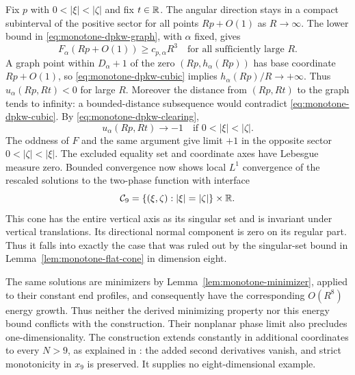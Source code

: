 Fix $p$ with $0<|\xi|<|\zeta|$ and fix $t\in\mathbb R$.
The angular direction stays in a compact subinterval of the positive
sector for all points $Rp+O(1)$ as $R\to\infty$.  The lower bound
in \eqref{eq:monotone-dpkw-graph}, with $\alpha$ fixed, gives
\begin{equation}
 F_\alpha(Rp+O(1))\ge c_{p,\alpha}R^3
 \quad\text{for all sufficiently large }R.
 \label{eq:monotone-dpkw-cubic}
\end{equation}
A graph point within $D_\alpha+1$ of the zero
$(Rp,h_\alpha(Rp))$ has base coordinate $Rp+O(1)$, so
\eqref{eq:monotone-dpkw-cubic} implies
$h_\alpha(Rp)/R\to+\infty$.  Thus $u_\alpha(Rp,Rt)<0$ for
large $R$.  Moreover the distance from $(Rp,Rt)$ to the graph tends
to infinity: a bounded-distance subsequence would contradict
\eqref{eq:monotone-dpkw-cubic}.  By
\eqref{eq:monotone-dpkw-clearing},
\[
 u_\alpha(Rp,Rt)\longrightarrow-1
           \quad\text{if }0<|\xi|<|\zeta|.
\]
The oddness of $F$ and the same argument give limit $+1$ in the
opposite sector $0<|\zeta|<|\xi|$.  The excluded equality set and
coordinate axes have Lebesgue measure zero.  Bounded convergence now
shows local $L^1$ convergence of the rescaled solutions to the two-phase
function with interface
\begin{equation}
 \mathcal C_9=
      \{(\xi,\zeta):|\xi|=|\zeta|\}\times\mathbb R.
 \label{eq:monotone-dpkw-cylinder}
\end{equation}
This cone has the entire vertical axis as its singular set and is
invariant under vertical translations.  Its directional normal
component is zero on its regular part.  Thus it falls into exactly the
case that was ruled out by the singular-set bound in
Lemma~\ref{lem:monotone-flat-cone} in dimension eight.

The same solutions are minimizers by
Lemma~\ref{lem:monotone-minimizer}, applied to their constant end
profiles, and consequently have the corresponding $O(R^8)$ energy
growth.  Thus neither the derived minimizing property nor this energy
bound conflicts with the construction.  Their nonplanar phase limit
also precludes one-dimensionality.  The construction extends constantly
in additional coordinates to every $N>9$, as explained in
\citet[p.~1490]{DPKW2011}: the added second derivatives vanish, and
strict monotonicity in $x_9$ is preserved.  It supplies no
eight-dimensional example.
